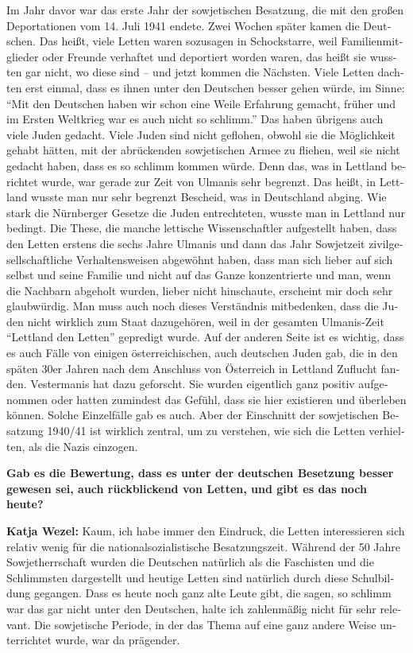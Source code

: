 \begin{otherlanguage}{ngerman}
Im Jahr davor war das erste Jahr der sowjetischen Besatzung, die mit den großen Deportationen vom 14. Juli 1941 endete. Zwei Wochen später kamen die Deutschen. Das heißt, viele Letten waren sozusagen in Schockstarre, weil Familienmitglieder oder Freunde verhaftet und deportiert worden waren, das heißt sie wussten gar nicht, wo diese sind – und jetzt kommen die Nächsten. Viele Letten dachten erst einmal, dass es ihnen unter den Deutschen besser gehen würde, im Sinne: "`Mit den Deutschen haben wir schon eine Weile Erfahrung gemacht, früher und im Ersten Weltkrieg war es auch nicht so schlimm."' Das haben übrigens auch viele Juden gedacht. Viele Juden sind nicht geflohen, obwohl sie die Möglichkeit gehabt hätten, mit der abrückenden sowjetischen Armee zu fliehen, weil sie nicht gedacht haben, dass es so schlimm kommen würde. Denn das, was in Lettland berichtet wurde, war gerade zur Zeit von Ulmanis sehr begrenzt. Das heißt, in Lettland wusste man nur sehr begrenzt Bescheid, was in Deutschland abging. Wie stark die Nürnberger Gesetze die Juden entrechteten, wusste man in Lettland nur bedingt. Die These, die manche lettische Wissenschaftler aufgestellt haben, dass den Letten erstens die sechs Jahre Ulmanis und dann das Jahr Sowjetzeit zivilgesellschaftliche Verhaltensweisen abgewöhnt haben, dass man sich lieber auf sich selbst und seine Familie und nicht auf das Ganze konzentrierte und man, wenn die Nachbarn abgeholt wurden, lieber nicht hinschaute, erscheint mir doch sehr glaubwürdig. Man muss auch noch dieses Verständnis mitbedenken, dass die Juden nicht wirklich zum Staat dazugehören, weil in der gesamten Ulmanis-Zeit "`Lettland den Letten"' gepredigt wurde. Auf der anderen Seite ist es wichtig, dass es auch Fälle von einigen österreichischen, auch deutschen Juden gab, die in den späten 30er Jahren nach dem Anschluss von Österreich in Lettland Zuflucht fanden. Vestermanis hat dazu geforscht. Sie wurden eigentlich ganz positiv aufgenommen oder hatten zumindest das Gefühl, dass sie hier existieren und überleben können. Solche Einzelfälle gab es auch. Aber der Einschnitt der sowjetischen Besatzung 1940/41 ist wirklich zentral, um zu verstehen, wie sich die Letten verhielten, als die Nazis einzogen. 

\textbf{Gab es die Bewertung, dass es unter der deutschen Besetzung besser gewesen sei, auch rückblickend von Letten, und gibt es das noch heute?} 

\textbf{Katja Wezel:} Kaum, ich habe immer den Eindruck, die Letten interessieren sich relativ wenig für die nationalsozialistische Besatzungszeit. Während der 50 Jahre Sowjetherrschaft wurden die Deutschen natürlich als die Faschisten und die Schlimmsten dargestellt und heutige Letten sind natürlich durch diese Schulbildung gegangen. Dass es heute noch ganz alte Leute gibt, die sagen, so schlimm war das gar nicht unter den Deutschen, halte ich zahlenmäßig nicht für sehr relevant. Die sowjetische Periode, in der das Thema auf eine ganz andere Weise unterrichtet wurde, war da prägender. 


\end{otherlanguage}

